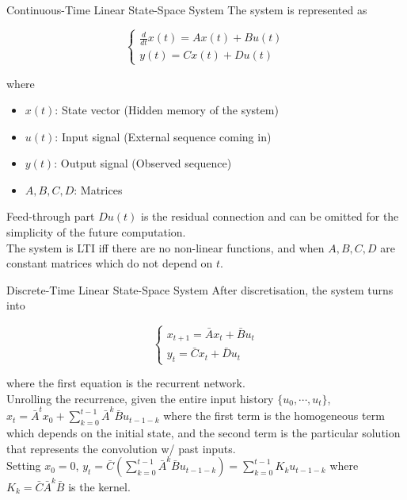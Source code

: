 \documentclass[xcolor=dvipsnames,aspectratio=169]{beamer}
\begin{document}
            \begin{frame}{Continuous-Time Linear State-Space System}
                The system is represented as
                
                \begin{equation*} 
                    \begin{cases}
                        \frac{d}{dt} x(t) = Ax(t) + Bu(t) \\
                        y(t) = C x(t) + D u(t)
                    \end{cases}
                \end{equation*}

                where 

                \begin{itemize}
                    \item $x(t)$: State vector (Hidden memory of the system)
                    \item $u(t)$: Input signal (External sequence coming in)
                    \item $y(t)$: Output signal (Observed sequence)
                    \item $A, B, C, D$: Matrices
                \end{itemize}
                
                Feed-through part $Du(t)$ is the residual connection and can be omitted for the simplicity of the future computation. \\
                The system is LTI iff there are no non-linear functions, and when $A, B, C, D$ are constant matrices which do not depend on $t$. 
            \end{frame}

            \begin{frame}{Discrete-Time Linear State-Space System}
                After discretisation, the system turns into 
                
                \begin{equation*} 
                    \begin{cases}
                        x_{t + 1} = \bar{A} x_{t} + \bar{B} u_{t} \\
                        y_{t} = \bar{C} x_{t} + \bar{D} u_{t}
                    \end{cases}
                \end{equation*}

                where the first equation is the recurrent network. \\
                Unrolling the recurrence, given the entire input history $\{ u_{0}, \cdots, u_{t} \}$, $x_{t} = \bar{A}^{t} x_{0} + \sum_{k = 0}^{t - 1} \bar{A}^{k} \bar{B} u_{t - 1 - k}$ where the first term is the homogeneous term which depends on the initial state, and the second term is the particular solution that represents the convolution w/ past inputs. \\
                Setting $x_{0} = 0$, $y_{t} = \bar{C} (\sum_{k = 0}^{t - 1} \bar{A}^{k} \bar{B} u_{t - 1 - k}) = \sum_{k = 0}^{t - 1} K_{k} u_{t - 1 - k}$ where $K_{k} = \bar{C} \bar{A}^{k} \bar{B}$ is the kernel.
            \end{frame}
\end{document}
